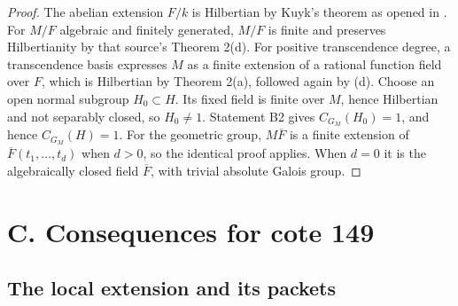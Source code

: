 \documentclass[11pt,a4paper]{article}
\begin{document}
\begin{proof}
The abelian extension $F/k$ is Hilbertian by Kuyk's theorem as opened in
\cite[\S4, Theorem 2(g)(2)]{B_Geyer2012}. For $M/F$ algebraic and finitely
generated, $M/F$ is finite and preserves Hilbertianity by that source's
Theorem 2(d). For positive transcendence degree, a transcendence basis
expresses $M$ as a finite extension of a rational function field over
$F$, which is Hilbertian by Theorem 2(a), followed again by (d).
Choose an open normal subgroup $H_0\subset H$. Its fixed field is finite
over $M$, hence Hilbertian and not separably closed, so $H_0\ne1$.
Statement B2 gives $C_{G_M}(H_0)=1$, and hence $C_{G_M}(H)=1$.
For the geometric group, $M\overline F$ is a finite extension of
$\overline F(t_1,\ldots,t_d)$ when $d>0$, so the identical proof applies.
When $d=0$ it is the algebraically closed field $\overline F$, with trivial
absolute Galois group.
\end{proof}


\section{C. Consequences for cote 149}

\subsection{The local extension and its packets}
\end{document}
